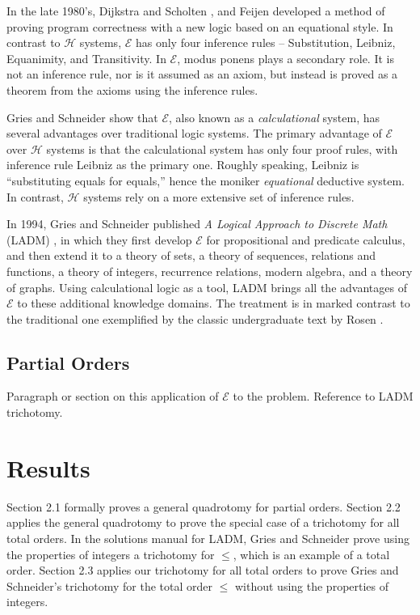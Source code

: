 \documentclass[12pt, fleqn, leqno]{article}
\begin{document}
In the late 1980's, Dijkstra and Scholten \cite{DandS}, and Feijen \cite{Feij} developed a method of proving program correctness with a new logic based on an equational style.
In contrast to $\mathcal{H}$ systems, $\mathcal{E}$ has only four inference rules -- Substitution, Leibniz, Equanimity, and Transitivity.
In $\mathcal{E}$, modus ponens plays a secondary role.
It is not an inference rule, nor is it assumed as an axiom, but instead is proved as a theorem from the axioms using the inference rules.

Gries and Schneider \cite{Gries1995, Gries1995145} show that $\mathcal{E}$, also known as a \textit{calculational} system, has several advantages over traditional logic systems.
The primary advantage of $\mathcal{E}$ over $\mathcal{H}$ systems is that the calculational system has only four proof rules, with inference rule Leibniz as the primary one.
Roughly speaking, Leibniz is ``substituting equals for equals,'' hence the moniker \textit{equational} deductive system.
In contrast, $\mathcal{H}$ systems rely on a more extensive set of inference rules.

In 1994, Gries and Schneider published \textit{A Logical Approach to Discrete Math} (LADM) \cite{LADM}, in which they first develop $\mathcal{E}$ for propositional and predicate calculus, and then extend it to a theory of sets, a theory of sequences, relations and functions, a theory of integers, recurrence relations, modern algebra, and a theory of graphs.
Using calculational logic as a tool, LADM brings all the advantages of $\mathcal{E}$ to these additional knowledge domains.
The treatment is in marked contrast to the traditional one exemplified by the classic undergraduate text by Rosen \cite{Rosen}.

\subsection{Partial Orders}

Paragraph or section on this application of $\mathcal{E}$ to the problem.
Reference to LADM trichotomy.

\section{Results}

Section 2.1 formally proves a general quadrotomy for partial orders.
Section 2.2 applies the general quadrotomy to prove the special case of a trichotomy for all total orders.
In the solutions manual for LADM, Gries and Schneider prove using the properties of integers a trichotomy for $\le$, which is an example of a total order.
Section 2.3 applies our trichotomy for all total orders to prove Gries and Schneider's trichotomy for the total order $\le$ without using the properties of integers.
\end{document}
